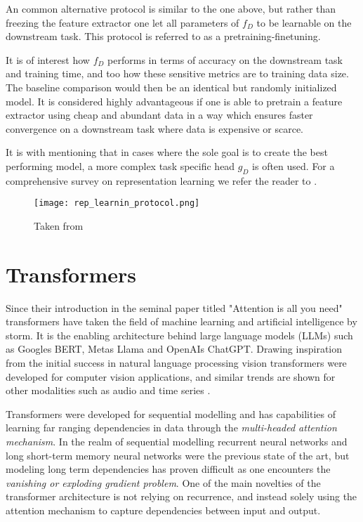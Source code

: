 \documentclass[../../thesis.tex]{subfiles}
\begin{document}
An common alternative protocol is similar to the one above, but rather than freezing the feature extractor one let all parameters of $f_D$ to be learnable on the downstream task. This protocol is referred to as a pretraining-finetuning. \newline

It is of interest how $f_D$ performs in terms of accuracy on the downstream task and training time, and too how these sensitive metrics are to training data size. The baseline comparison would then be an identical but randomly initialized model. It is considered highly advantageous if one is able to pretrain a feature extractor using cheap and abundant data in a way which ensures faster convergence on a downstream task where data is expensive or scarce.\newline

It is with mentioning that in cases where the sole goal is to create the best performing model, a more complex task specific head $g_D$ is often used. For a comprehensive survey on representation learning we refer the reader to \cite{nozawa2022empirical}.


\begin{figure}[h]
    \texttt{[image: rep\_learnin\_protocol.png]}
    \centering    
    \caption{Taken from \cite{nozawa2022empirical}}
\end{figure}




\section{Transformers}

Since their introduction in the seminal paper titled "Attention is all you need"\cite{vaswani2023attention} transformers have taken the field of machine learning and artificial intelligence by storm. It is the enabling architecture behind large language models (LLMs) such as Googles BERT, Metas Llama and OpenAIs ChatGPT. Drawing inspiration from the initial success in natural language processing vision transformers \cite{dosovitskiy2021image} were developed for computer vision applications, and similar trends are shown for other modalities such as audio \cite{latif2023transformers} and time series \cite{wen2023transformers}. \newline

Transformers were developed for sequential modelling and has capabilities of learning far ranging dependencies in data through the \textit{multi-headed attention mechanism}. In the realm of sequential modelling recurrent neural networks  and long short-term memory neural networks were the previous state of the art, but modeling long term dependencies has proven difficult \cite{279181} as one encounters the \textit{vanishing or exploding gradient problem}. One of the main novelties of the transformer architecture is not relying on recurrence, and instead solely using the attention mechanism to capture dependencies between input and output.\newline
\end{document}
